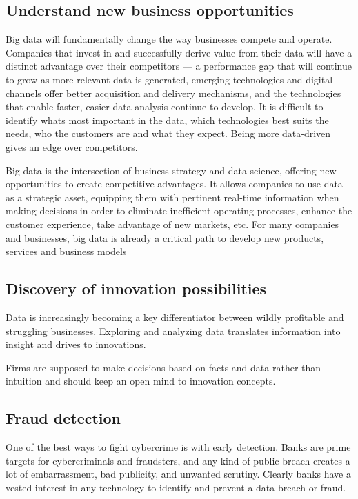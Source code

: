 \documentclass[sigconf]{acmart}
\begin{document}
\subsection{Understand new business opportunities}
Big data will fundamentally change the way businesses
compete and operate. Companies that invest in and
successfully derive value from their data will have a distinct advantage over their competitors — a performance gap that will continue to grow as more relevant data is generated, emerging technologies and digital channels offer better acquisition and delivery mechanisms, and the technologies that enable faster, easier data analysis continue to develop. It is difficult to identify whats most important in the data, which technologies best suits the needs, who the customers are and what they expect. Being more data-driven gives an edge over competitors.  

Big data is the intersection of business strategy and data science, offering new opportunities to create competitive advantages. It allows companies to use data as a strategic asset, equipping them with pertinent real-time information when making decisions in order to eliminate inefficient operating processes, enhance the customer experience, take advantage of new markets, etc.
For many companies and businesses, big data is already a critical path to develop new products, services and business models

\subsection{Discovery of innovation possibilities}
Data is increasingly becoming a key differentiator between wildly profitable and struggling businesses. Exploring and analyzing data translates information into insight and drives to innovations. 

Firms are supposed to make decisions based on facts and data rather than intuition and should keep an open mind to innovation concepts. 

\subsection{Fraud detection}
One of the best ways to fight cybercrime is with early detection. Banks are prime targets for cybercriminals and fraudsters, and any kind of public breach creates a lot of embarrassment, bad publicity, and unwanted scrutiny. Clearly banks have a vested interest in any technology to identify and prevent a data breach or fraud.
\end{document}
